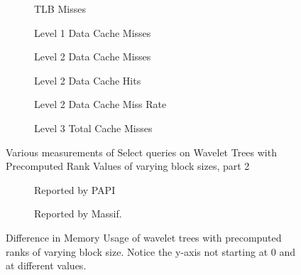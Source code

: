 \begin{figure}\tiny
\begin{subfigure}{0.48\textwidth}
	
	\caption{TLB Misses}
	\label{fig:PrecomputedRankBlockSize_Select_TLB}
\end{subfigure}
\hfill
\begin{subfigure}{0.48\textwidth}
	
	\caption{Level 1 Data Cache Misses}
	\label{fig:PrecomputedRankBlockSize_Select_L1CacheMiss}
\end{subfigure}

\begin{subfigure}{0.48\textwidth}
	
	\caption{Level 2 Data Cache Misses}
	\label{fig:PrecomputedRankBlockSize_Select_L2CacheMiss}
\end{subfigure}
\hfill
\begin{subfigure}{0.48\textwidth}
	
	\caption{Level 2 Data Cache Hits}
	\label{fig:PrecomputedRankBlockSize_Select_L2CacheHits}
\end{subfigure}

\begin{subfigure}{0.48\textwidth}
	
	\caption{Level 2 Data Cache Miss Rate}
	\label{fig:PrecomputedRankBlockSize_Select_L2CacheMissRate}
\end{subfigure}
\hfill
\begin{subfigure}{0.48\textwidth}
	
	\caption{Level 3 Total Cache Misses}
	\label{fig:PrecomputedRankBlockSize_Select_L3CacheMiss}
\end{subfigure}
\caption{Various measurements of Select queries on Wavelet Trees with Precomputed Rank Values of varying block sizes, part 2}
\label{fig:PrecomputedRankBlockSize_Select2}
\end{figure}


\begin{figure}\tiny
	\begin{subfigure}{0.48\textwidth}
		
		\caption{Reported by PAPI}
		\label{fig:PrecomputedRankBlockSize_PAPI}
	\end{subfigure}
	\hfill
	\begin{subfigure}{0.48\textwidth}
		
		\caption{Reported by Massif.}
		\label{fig:PrecomputedRankBlockSize_Massif}
	\end{subfigure}
	\caption{Difference in Memory Usage of wavelet trees with precomputed ranks of varying block size. Notice the y-axis not starting at 0 and at different values.}
	\label{fig:PrecomputedRankBlockSize_Memory}
\end{figure}


